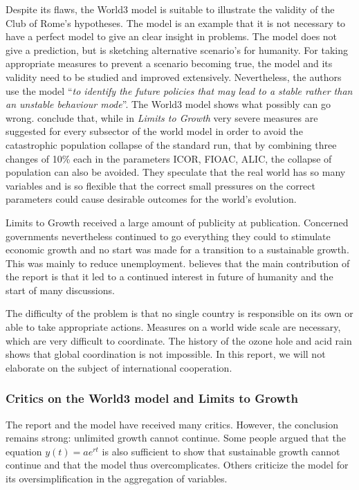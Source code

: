 \documentclass[10pt,a4paper]{scrartcl}
\begin{document}
Despite its flaws, the World3 model is suitable to illustrate the validity of the Club of Rome's hypotheses. The model is an example that it is not necessary to have a perfect model to give an clear insight in problems. The model does not give a prediction, but is sketching alternative scenario's for humanity. For taking appropriate measures to prevent a scenario becoming true, the model and its validity need to be studied and improved extensively. Nevertheless, the authors use the model ``\emph{to identify the future policies that may lead to a stable rather than an unstable behaviour mode}''. The World3 model shows what possibly can go wrong. \cite{vermeulen1976parameter} conclude that, while in \emph{Limits to Growth} very severe measures are suggested for every subsector of the world model in order to avoid the catastrophic population collapse of the standard run, that by combining three changes of 10\% each in the parameters ICOR, FIOAC, ALIC, the collapse of population can also be avoided. They speculate that the real world has so many variables and is so flexible that the correct small pressures on the correct parameters could cause desirable outcomes for the world's evolution.

Limits to Growth received a large amount of publicity at publication. Concerned governments nevertheless continued to go everything they could to stimulate economic growth and no start was made for a transition to a sustainable growth. This was mainly to reduce unemployment. \cite{voorbijdegrenzen} believes that the main contribution of the report is that it led to a continued interest in future of humanity and the start of many discussions.

The difficulty of the problem is that no single country is responsible on its own or able to take appropriate actions. Measures on a world wide scale are necessary, which are very difficult to coordinate. The history of the ozone hole and acid rain shows that global coordination is not impossible. In this report, we will not elaborate on the subject of international cooperation.

\subsubsection*{Critics on the World3 model and Limits to Growth}

The report and the model have received many critics. However, the conclusion remains strong: unlimited growth cannot continue. Some people argued that the equation $y(t) = ae^{rt}$ is also sufficient to show that sustainable growth cannot continue and that the model thus overcomplicates. Others criticize the model for its oversimplification in the aggregation of variables.
\end{document}
